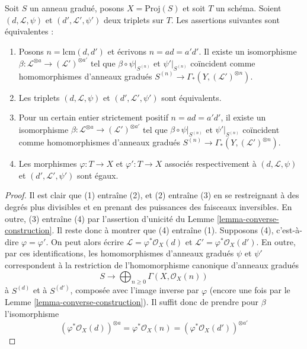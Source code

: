 \begin{lemma}
\label{lemma-equivalent}
Soit $S$ un anneau gradué, posons $X = \text{Proj}(S)$ et soit $T$ un schéma.
Soient $(d, \mathcal{L}, \psi)$ et $(d', \mathcal{L}', \psi')$ deux triplets
sur $T$. Les assertions suivantes sont équivalentes :
\begin{enumerate}
\item Posons $n = \text{lcm}(d, d')$ et écrivons $n = ad = a'd'$.
Il existe un isomorphisme
$\beta : \mathcal{L}^{\otimes a} \to (\mathcal{L}')^{\otimes a'}$ tel que
$\beta \circ \psi|_{S^{(n)}}$ et $\psi'|_{S^{(n)}}$ coïncident comme
homomorphismes d'anneaux gradués
$S^{(n)} \to \Gamma_*(Y, (\mathcal{L}')^{\otimes n})$.
\item Les triplets $(d, \mathcal{L}, \psi)$ et
$(d', \mathcal{L}', \psi')$ sont équivalents.
\item Pour un certain entier strictement positif $n = ad = a'd'$, il existe un
isomorphisme
$\beta : \mathcal{L}^{\otimes a} \to (\mathcal{L}')^{\otimes a'}$ tel que
$\beta \circ \psi|_{S^{(n)}}$ et $\psi'|_{S^{(n)}}$ coïncident comme
homomorphismes d'anneaux gradués
$S^{(n)} \to \Gamma_*(Y, (\mathcal{L}')^{\otimes n})$.
\item Les morphismes $\varphi : T \to X$ et $\varphi' : T \to X$ associés
respectivement à $(d, \mathcal{L}, \psi)$ et
$(d', \mathcal{L}', \psi')$ sont égaux.
\end{enumerate}
\end{lemma}

\begin{proof}
Il est clair que (1) entraîne (2), et
(2) entraîne (3) en se restreignant à
des degrés plus divisibles et en prenant des puissances des faisceaux
inversibles. En outre, (3) entraîne (4) par l'assertion d'unicité du
Lemme \ref{lemma-converse-construction}. Il reste donc à montrer que (4)
entraîne (1). Supposons (4), c'est-à-dire $\varphi = \varphi'$.
On peut alors écrire
$\mathcal{L} = \varphi^*\mathcal{O}_X(d)$ et
$\mathcal{L}' = \varphi^*\mathcal{O}_X(d')$.
En outre, par ces identifications,
les homomorphismes d'anneaux gradués $\psi$ et $\psi'$ correspondent à la
restriction de l'homomorphisme canonique d'anneaux gradués
$$
S \longrightarrow \bigoplus\nolimits_{n \geq 0} \Gamma(X, \mathcal{O}_X(n))
$$
à $S^{(d)}$ et à $S^{(d')}$, composée avec l'image inverse par $\varphi$
(encore une fois par le Lemme
\ref{lemma-converse-construction}). Il suffit
donc de prendre pour $\beta$ l'isomorphisme
$$
(\varphi^*\mathcal{O}_X(d))^{\otimes a} =
\varphi^*\mathcal{O}_X(n) =
(\varphi^*\mathcal{O}_X(d'))^{\otimes a'}
$$
\end{proof}

